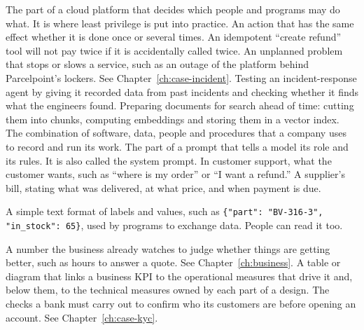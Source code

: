 \begin{description}[style=nextline, leftmargin=1.2em, itemsep=4pt, font=\normalfont\bfseries\sffamily\small]
 The part of a cloud platform that decides which people and programs may do what. It is where least privilege is put into practice.
 An action that has the same effect whether it is done once or several times. An idempotent ``create refund'' tool will not pay twice if it is accidentally called twice.
 An unplanned problem that stops or slows a service, such as an outage of the platform behind Parcelpoint's lockers. See Chapter~\ref{ch:case-incident}.
 Testing an incident-response agent by giving it recorded data from past incidents and checking whether it finds what the engineers found.
 Preparing documents for search ahead of time: cutting them into chunks, computing embeddings and storing them in a vector index.
 The combination of software, data, people and procedures that a company uses to record and run its work.
 The part of a prompt that tells a model its role and its rules. It is also called the system prompt.
 In customer support, what the customer wants, such as ``where is my order'' or ``I want a refund.''
 A supplier's bill, stating what was delivered, at what price, and when payment is due.

 A simple text format of labels and values, such as \texttt{\{"part": "BV-316-3", "in\_stock": 65\}}, used by programs to exchange data. People can read it too.

 A number the business already watches to judge whether things are getting better, such as hours to answer a quote. See Chapter~\ref{ch:business}.
 A table or diagram that links a business KPI to the operational measures that drive it and, below them, to the technical measures owned by each part of a design.
 The checks a bank must carry out to confirm who its customers are before opening an account. See Chapter~\ref{ch:case-kyc}.


\end{description}
